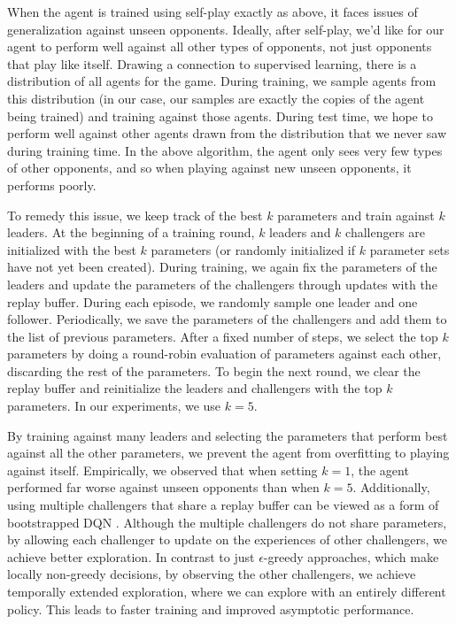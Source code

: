 \documentclass[10pt,twocolumn,letterpaper]{article}
\begin{document}
When the agent is trained using self-play exactly as above, it faces issues of
generalization against unseen opponents. Ideally, after self-play, we'd like
for our agent to perform well against all other types of opponents, not just
opponents that play like itself. Drawing a connection to supervised learning,
there is a distribution of all agents for the game. During training, we sample
agents from this distribution (in our case, our samples are exactly the copies
of the agent being trained) and training against those agents. During test
time, we hope to perform well against other agents drawn from the distribution
that we never saw during training time. In the above algorithm, the agent only
sees very few types of other opponents, and so when playing against new unseen
opponents, it performs poorly.

To remedy this issue, we keep track of the best $k$ parameters and train
against $k$ leaders. At the beginning of a training round, $k$ leaders and $k$
challengers are initialized with the best $k$ parameters (or randomly
initialized if $k$ parameter sets have not yet been created). During training,
we again fix the parameters of the leaders and update the parameters of the
challengers through updates with the replay buffer. During each episode, we
randomly sample one leader and one follower. Periodically, we save the
parameters of the challengers and add them to the list of previous parameters.
After a fixed number of steps, we select the top $k$ parameters by doing a
round-robin evaluation of parameters against each other, discarding the rest
of the parameters. To begin the next round, we clear the replay buffer and
reinitialize the leaders and challengers with the top $k$ parameters. In our
experiments, we use $k = 5$.

By training against many leaders and selecting the parameters that perform
best against all the other parameters, we prevent the agent from overfitting
to playing against itself. Empirically, we observed that when setting $k = 1$,
the agent performed far worse against unseen opponents than when $k = 5$.
Additionally, using multiple challengers that share a replay buffer can be
viewed as a form of bootstrapped DQN \citep{osband2016deep}. Although the
multiple challengers do not share parameters, by allowing each challenger to
update on the experiences of other challengers, we achieve better exploration.
In contrast to just $\epsilon$-greedy approaches, which make locally
non-greedy decisions, by observing the other challengers, we achieve
temporally extended exploration, where we can explore with an entirely
different policy. This leads to faster training and improved asymptotic
performance.
\end{document}
